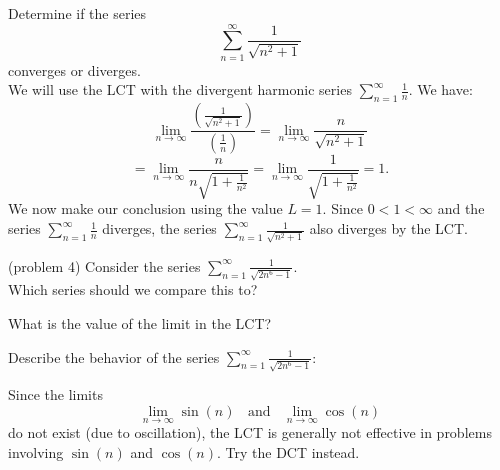 \documentclass{ximera}
\begin{document}
\begin{example}[example 4]
Determine if the series 
\[
\sum_{n=1}^\infty \frac{1}{\sqrt{n^2 + 1}}
\]
converges or diverges.\\
We will use the LCT with the divergent harmonic series $\displaystyle{\sum_{n=1}^\infty \frac{1}{n}}$. We have:
\[
\lim_{n \to \infty} \frac{\left(\frac{1}{\sqrt{n^2 + 1}}\right)}{\left(\frac{1}{n}\right)} = \lim_{n \to \infty} \frac{n}{\sqrt{n^2 + 1}}
\]
\[
= \lim_{n \to \infty} \frac{n}{n\sqrt{1 + \frac{1}{n^2}}} = \lim_{n \to \infty} \frac{1}{\sqrt{1 + \frac{1}{n^2}}} = 1.
\]
We now make our conclusion using the value $L = 1$. Since $0 < 1 < \infty$ and the series $\displaystyle{\sum_{n=1}^\infty \frac{1}{n}}$
diverges, the series $\displaystyle{\sum_{n=1}^\infty \frac{1}{\sqrt{n^2 + 1}}}$ also diverges by the LCT.
\end{example}




\begin{problem}(problem 4)
Consider the series $\displaystyle{\sum_{n=1}^\infty \frac{1}{\sqrt{2n^6 - 1}}}$.\\
Which series should we compare this to?

\begin{multipleChoice}
\end{multipleChoice}

What is the value of the limit in the LCT?
\begin{multipleChoice}
\end{multipleChoice}

Describe the behavior of the series $\sum_{n=1}^\infty \frac{1}{\sqrt{2n^6 - 1}}:$
\begin{multipleChoice}
\end{multipleChoice}

\end{problem}


\begin{remark}
Since the limits
\[
\lim_{n \to \infty} \sin(n) \;\; \text{ and } \;\; \lim_{n \to \infty} \cos(n)
\]
do not exist (due to oscillation), the LCT is generally not effective in problems involving $\sin(n)$ and $\cos(n)$. Try the DCT instead.
\end{remark}
\end{document}
